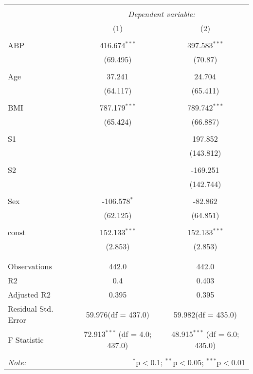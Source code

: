 \documentclass[12pt]{article}
\numberwithin{equation}{subsection}
\begin{document}
\begin{table}[!htbp] \centering
  \label{}
\begin{tabular}{@{\extracolsep{5pt}}lcc}
\\[-1.8ex]\hline
\hline \\[-1.8ex]
& \multicolumn{2}{c}{\textit{Dependent variable:}} \
\cr \cline{2-3}
\\[-1.8ex] & (1) & (2) \\
\hline \\[-1.8ex]
 ABP & 416.674$^{***}$ & 397.583$^{***}$ \\
  & (69.495) & (70.87) \\
  & & \\
 Age & 37.241$^{}$ & 24.704$^{}$ \\
  & (64.117) & (65.411) \\
  & & \\
 BMI & 787.179$^{***}$ & 789.742$^{***}$ \\
  & (65.424) & (66.887) \\
  & & \\
 S1 & & 197.852$^{}$ \\
  & & (143.812) \\
  & & \\
 S2 & & -169.251$^{}$ \\
  & & (142.744) \\
  & & \\
 Sex & -106.578$^{*}$ & -82.862$^{}$ \\
  & (62.125) & (64.851) \\
  & & \\
 const & 152.133$^{***}$ & 152.133$^{***}$ \\
  & (2.853) & (2.853) \\
  & & \\
\hline \\[-1.8ex]
 Observations & 442.0 & 442.0 \\
 R${2}$ & 0.4 & 0.403 \\
 Adjusted R${2}$ & 0.395 & 0.395 \\
 Residual Std. Error & 59.976(df = 437.0) & 59.982(df = 435.0)  \\
 F Statistic & 72.913$^{***}$ (df = 4.0; 437.0) & 48.915$^{***}$ (df = 6.0; 435.0) \\
\hline
\hline \\[-1.8ex]
\textit{Note:} & \multicolumn{2}{r}{$^{*}$p$<$0.1; $^{**}$p$<$0.05; $^{***}$p$<$0.01} \\
\end{tabular}
\end{table}
\end{document}
